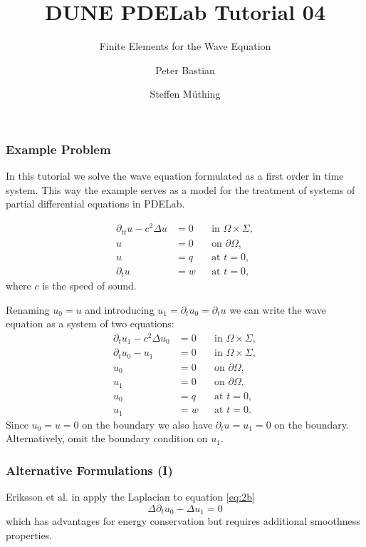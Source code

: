 \documentclass[aspectratio=169,11pt]{beamer}
\title{DUNE PDELab Tutorial 04}
\subtitle{\small Finite Elements for the Wave Equation}
\author{Peter Bastian \and Steffen Müthing}
\institute[]
{
  IWR\\
  Heidelberg University
}
\theoremstyle{definition}
\begin{document}



\begin{frame}
\frametitle{Example Problem}
 In this tutorial we solve the wave equation formulated as a first order
in time system. This way the example serves as a model for the
treatment of systems of partial differential equations in PDELab.

\begin{subequations}
\label{eq:WaveEquation}
\begin{align}
\partial_{tt} u-c^2\Delta u  &= 0 &&\text{in $\Omega\times\Sigma$},\\
u &= 0 &&\text{on $\partial\Omega$},\\
u &= q &&\text{at $t=0$},\\
\partial_t u &= w &&\text{at $t=0$},
\end{align}
\end{subequations}
where $c$ is the speed of sound.
\end{frame}
\begin{frame}
Renaming $u_0=u$ and introducing $u_1=\partial_t u_0 =\partial_t u$ we can write the wave equation as a system of two equations:
\begin{subequations}
\label{eq:SystemForm1}
\begin{align}
\partial_t u_1 - c^2\Delta u_0 &=0 &&\text{in $\Omega\times\Sigma$}, \label{eq:2a}\\
\partial_t u_0 - u_1 &=0 &&\text{in $\Omega\times\Sigma$}, \label{eq:2b}\\
u_0 &= 0 &&\text{on $\partial\Omega$},\\
u_1 &= 0 &&\text{on $\partial\Omega$},\\
u_0 &= q &&\text{at $t=0$},\\
u_1 &= w &&\text{at $t=0$}.
\end{align}
\end{subequations}
Since $u_0=u=0$ on the boundary we also have $\partial_t u = u_1 = 0$ on the boundary.
Alternatively, omit the boundary condition on $u_1$.
\end{frame}


\begin{frame}
\frametitle{Alternative Formulations (I)}
Eriksson et al. in \cite{Eriksson} apply the Laplacian to
equation \eqref{eq:2b}
\begin{equation}
\Delta \partial_t u_0 - \Delta u_1 = 0
\end{equation} \label{eq:Eriksson}
which has advantages for energy conservation but requires additional smoothness
properties.
\end{frame}
\end{document}
